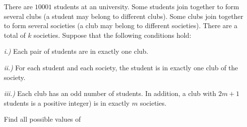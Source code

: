 There are $10001$ students at an university. Some students join together to form several clubs (a student may belong to different clubs). Some clubs join together to form several societies (a club may belong to different societies). There are a total of $k$ societies. Suppose that the following conditions hold:

\textit{i.)} Each pair of students are in exactly one club.

\textit{ii.)} For each student and each society, the student is in exactly one club of the society.

\textit{iii.)} Each club has an odd number of students. In addition, a club with ${2m+1}$ students  is a positive integer) is
in exactly $m$ societies.

Find all possible values of 


